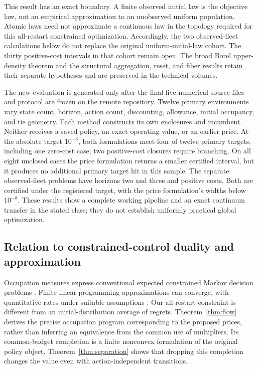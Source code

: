 This result has an exact boundary. A finite observed initial law is the objective law, not an empirical approximation to an unobserved uniform population. Atomic laws need not approximate a continuous law in the topology required for this all-restart constrained optimization. Accordingly, the two observed-fleet calculations below do not replace the original uniform-initial-law cohort. The thirty positive-cost intervals in that cohort remain open. The broad Borel upper-density theorem and the structural aggregation, reset, and fiber results retain their separate hypotheses and are preserved in the technical volumes.

The new evaluation is generated only after the final five numerical source files and protocol are frozen on the remote repository. Twelve primary environments vary state count, horizon, action count, discounting, allowance, initial occupancy, and tie geometry. Each method constructs its own enclosures and incumbent. Neither receives a saved policy, an exact operating value, or an earlier price. At the absolute target $10^{-3}$, both formulations meet four of twelve primary targets, including one zero-cost case; two positive-cost closures require branching. On all eight unclosed cases the price formulation returns a smaller certified interval, but it produces no additional primary target hit in this sample. The separate observed-fleet problems have horizons two and three and positive costs. Both are certified under the registered target, with the price formulation's widths below $10^{-8}$. These results show a complete working pipeline and an exact continuum transfer in the stated class; they do not establish uniformly practical global optimization.

\subsection{Relation to constrained-control duality and approximation}
Occupation measures express conventional expected constrained Markov decision problems \citep{Altman1999}. Finite linear-programming approximations can converge, with quantitative rates under suitable assumptions \citep{DufourPrietoRumeau2013,Saldi2018}. Our all-restart constraint is different from an initial-distribution average of regrets. Theorem~\ref{thm:flow} derives the precise occupation program corresponding to the proposed prices, rather than inferring an equivalence from the common use of multipliers. Its common-budget completion is a finite nonconvex formulation of the original policy object. Theorem~\ref{thm:separation} shows that dropping this completion changes the value even with action-independent transitions.

